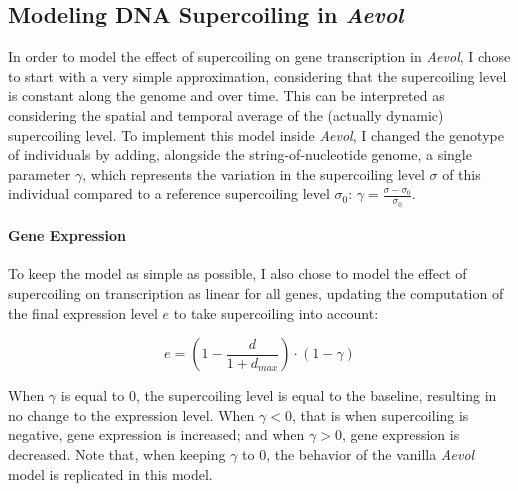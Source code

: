 \subsection{Modeling DNA Supercoiling in \emph{Aevol}}

In order to model the effect of supercoiling on gene transcription in \emph{Aevol}, I chose to start with a very simple approximation, considering that the supercoiling level is constant along the genome and over time.
This can be interpreted as considering the spatial and temporal average of the (actually dynamic) supercoiling level.
To implement this model inside \emph{Aevol}, I changed the genotype of individuals by adding, alongside the string-of-nucleotide genome, a single parameter $\gamma$, which represents the variation in the supercoiling level $\sigma$ of this individual compared to a reference supercoiling level $\sigma_0$: $\gamma = \frac{\sigma-\sigma_0}{\sigma_0}$.

\paragraph{Gene Expression}
To keep the model as simple as possible, I also chose to model the effect of supercoiling on transcription as linear for all genes, updating the computation of the final expression level $e$ to take supercoiling into account:

\begin{equation}
e = (1 - \frac{d}{1+d_{max}}) \cdot (1 - \gamma)
\label{eq:aevol:sc}
\end{equation}

When $\gamma$ is equal to 0, the supercoiling level is equal to the baseline, resulting in no change to the expression level.
When $\gamma < 0$, that is when supercoiling is negative, gene expression is increased; and when $\gamma > 0$, gene expression is decreased.
Note that, when keeping $\gamma$ to 0, the behavior of the vanilla \emph{Aevol} model is replicated in this model.

